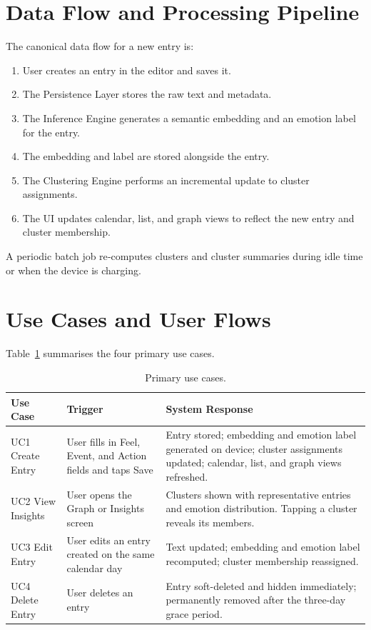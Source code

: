\section{Data Flow and Processing Pipeline}
The canonical data flow for a new entry is:

\begin{enumerate}
  \item User creates an entry in the editor and saves it.
  \item The Persistence Layer stores the raw text and metadata.
  \item The Inference Engine generates a semantic embedding and an emotion label for the entry.
  \item The embedding and label are stored alongside the entry.
  \item The Clustering Engine performs an incremental update to cluster assignments.
  \item The UI updates calendar, list, and graph views to reflect the new entry and cluster membership.
\end{enumerate}

A periodic batch job re‑computes clusters and cluster summaries during idle time or when the device is charging.

\section{Use Cases and User Flows}

Table~\ref{tab:use_cases} summarises the four primary use cases.

\begin{table}[h!]
\centering
\caption{Primary use cases.}
\label{tab:use_cases}
\begin{tabular}{p{} p{} p{}}
\hline
\textbf{Use Case} & \textbf{Trigger} & \textbf{System Response} \\
\hline
UC1 Create Entry &
  User fills in Feel, Event, and Action fields and taps Save &
  Entry stored; embedding and emotion label generated on device; cluster assignments updated; calendar, list, and graph views refreshed. \\
\hline
UC2 View Insights &
  User opens the Graph or Insights screen &
  Clusters shown with representative entries and emotion distribution. Tapping a cluster reveals its members. \\
\hline
UC3 Edit Entry &
  User edits an entry created on the same calendar day &
  Text updated; embedding and emotion label recomputed; cluster membership reassigned. \\
\hline
UC4 Delete Entry &
  User deletes an entry &
  Entry soft-deleted and hidden immediately; permanently removed after the three-day grace period. \\
\hline
\end{tabular}
\end{table}

